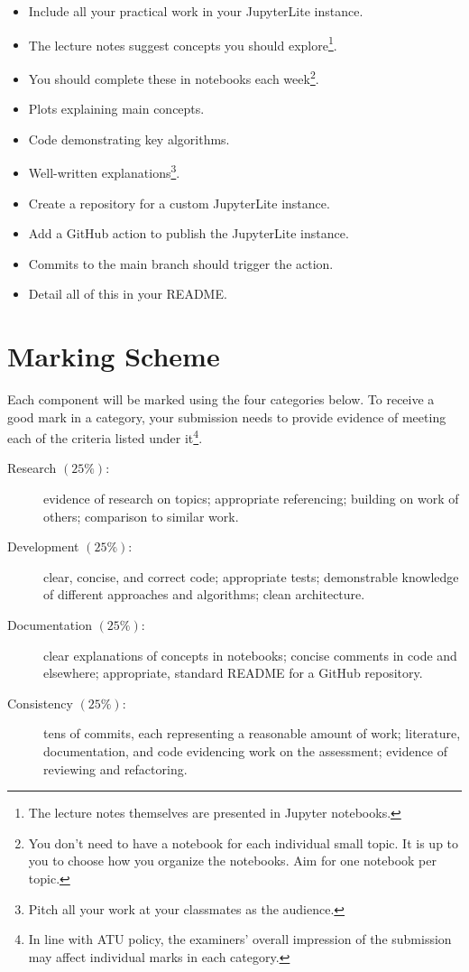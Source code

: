\documentclass[a4paper]{tufte-handout}
\begin{document}
\begin{itemize}
  \item Include all your practical work in your JupyterLite instance.
  \item The lecture notes suggest concepts you should explore\footnote{The lecture notes themselves are presented in Jupyter notebooks.}.
  \item You should complete these in notebooks each week\footnote{You don't need to have a notebook for each individual small topic. It is up to you to choose how you organize the notebooks. Aim for one notebook per topic.}.
  \item Plots explaining main concepts.
  \item Code demonstrating key algorithms.
  \item Well-written explanations\footnote{Pitch all your work at your classmates as the audience.}.
\end{itemize} 

\begin{itemize}
  \item Create a repository for a custom JupyterLite instance.
  \item Add a GitHub action to publish the JupyterLite instance.
  \item Commits to the main branch should trigger the action.
  \item Detail all of this in your README.
\end{itemize}


\section{Marking Scheme}
Each component will be marked using the four categories below.
To receive a good mark in a category, your submission needs to provide evidence of meeting each of the criteria listed under it\footnote{In line with ATU policy, the examiners' overall impression of the submission may affect individual marks in each category.}.

\begin{description}
  \item[Research $(25\%)$:] evidence of research on topics; appropriate referencing; building on work of others; comparison to similar work.
  \item[Development $(25\%)$:] clear, concise, and correct code; appropriate tests; demonstrable knowledge of different approaches and algorithms; clean architecture.
  \item[Documentation $(25\%)$:] clear explanations of concepts in notebooks; concise comments in code and elsewhere; appropriate, standard README for a GitHub repository.
  \item[Consistency $(25\%)$:] tens of commits, each representing a reasonable amount of work; literature, documentation, and code evidencing work on the assessment; evidence of reviewing and refactoring.
\end{description}
\end{document}
